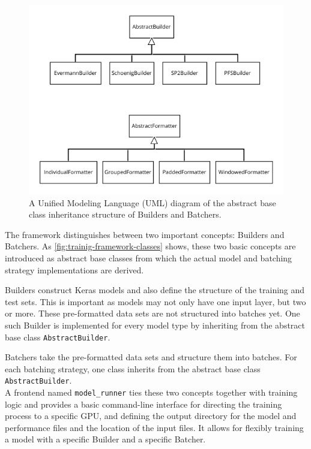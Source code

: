 \begin{figure}
    \centering
    \includegraphics[width=\textwidth]{gfx/training-framework-classes.png}
    \caption{A Unified Modeling Language (UML) diagram of the abstract base class inheritance structure of Builders and Batchers.}
    \label{fig:trainig-framework-classes}
\end{figure}

The framework distinguishes between two important concepts: Builders and Batchers. As \autoref{fig:trainig-framework-classes} shows, these two basic concepts are introduced as abstract base classes from which the actual model and batching strategy implementations are derived.

Builders construct Keras models and also define the structure of the training and test sets. This is important as models may not only have one input layer, but two or more. These pre-formatted data sets are not structured into batches yet. One such Builder is implemented for every model type by inheriting from the abstract base class \verb=AbstractBuilder=.

Batchers take the pre-formatted data sets and structure them into batches. For each batching strategy, one class inherits from the abstract base class \verb=AbstractBuilder=.\\

A frontend named \verb=model_runner= ties these two concepts together with training logic and provides a basic command-line interface for directing the training process to a specific GPU, and defining the output directory for the model and performance files and the location of the input files. It allows for flexibly training a model with a specific Builder and a specific Batcher.\\

